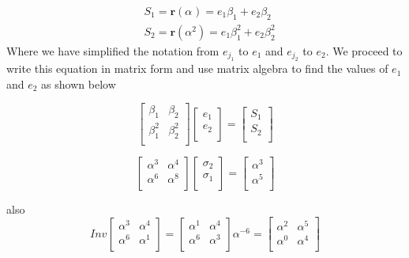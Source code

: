 \documentclass[fontsize=12pt]{article}
\begin{document}
\begin{equation}
\begin{split}
&{S}_1 =\mathbf{r}(\alpha^{})=e_{1} \beta_{1}^{} + e_{2} \beta_{2}^{}\\
 &{S}_2 =\mathbf{r}(\alpha^2)=e_{1} \beta_{1}^{2} + e_{2} \beta_{2}^{2}
 \end{split}
 \label{twentyeight}
\end{equation} Where we have simplified the notation from $e_{j_1}$ to $e_{1}$ and $e_{j_2}$ to $e_{2}$.
We proceed to write this equation in matrix form and use matrix algebra to find the values of $e_{1}$ and $e_{2}$ as shown below


\begin{equation*}
\begin{bmatrix}
    \beta_{1}       &  \beta_{2} \\
    \beta_{1}^2   &  \beta_{2}^2 \\
\end{bmatrix}
\begin{bmatrix}
    e_{1}\\
    e_{2}\\
   \end{bmatrix}
=
\begin{bmatrix}
     S_{1}\\
    S_{2}\\
\end{bmatrix}
\end{equation*}

\begin{equation}
\begin{bmatrix}
    \alpha^3       & \alpha^4 \\
    \alpha^6      &  \alpha^8 \\
\end{bmatrix}
\begin{bmatrix}
    \sigma_{2}\\
    \sigma_{1}\\
   \end{bmatrix}
=
\begin{bmatrix}
     \alpha^3\\
     \alpha^5\\
\end{bmatrix}
\label{twentynine}
\end{equation}

also
\begin{equation}
Inv
\begin{bmatrix}
    \alpha^3       & \alpha^4 \\
    \alpha^6      &  \alpha^1 \\
\end{bmatrix}
=
\begin{bmatrix}
    \alpha^1       & \alpha^4 \\
    \alpha^6      &  \alpha^3 \\
\end{bmatrix}
\alpha^{-6}=
\begin{bmatrix}
    \alpha^2       & \alpha^5 \\
    \alpha^0      &  \alpha^4 \\
\end{bmatrix}
\end{equation}
\end{document}

